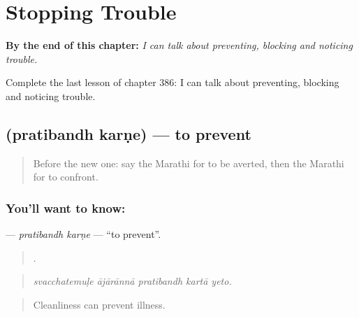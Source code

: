 
\chapter{Stopping Trouble}
\label{ch:mr-stopping-trouble}

\begin{chapteropening}
\textbf{By the end of this chapter:} \emph{I can talk about preventing, blocking and noticing trouble.}

Complete the last lesson of chapter 386: I can talk about preventing, blocking and noticing trouble.
\end{chapteropening}

\section[\texorpdfstring{\mr{प्रतिबंध} \mr{करणे} (pratibandh karṇe)}{प्रतिबंध करणे (pratibandh karṇe)}]{  (pratibandh karṇe) — to prevent}

\label{lesson:MR-C386-pratibandh-karne}



\begin{quote}
Before the new one: say the Marathi for to be averted, then the Marathi for to confront.
\end{quote}

\subsection*{You'll want to know:  }
\textbf{ } — \emph{pratibandh karṇe} — \textquotedblleft{}to prevent\textquotedblright{}.

\begin{quote}
    .
\end{quote}

\begin{quote}
\emph{svacchatemuḷe ājārānnā pratibandh kartā yeto.}
\end{quote}

\begin{quote}
Cleanliness can prevent illness.
\end{quote}

